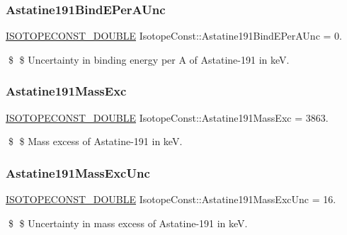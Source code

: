 \subsubsection{\texorpdfstring{Astatine191\+Bind\+E\+Per\+A\+Unc}{Astatine191BindEPerAUnc}}
{\footnotesize\ttfamily \mbox{\hyperlink{group___isotope_const-_macros_ga8f45a7272ce02c0b4c65c44636ed719a}{I\+S\+O\+T\+O\+P\+E\+C\+O\+N\+S\+T\+\_\+\+D\+O\+U\+B\+LE}} Isotope\+Const\+::\+Astatine191\+Bind\+E\+Per\+A\+Unc = 0.}

\$ \$ Uncertainty in binding energy per A of Astatine-\/191 in keV. \mbox{\label{group___isotope_const-_astatine-_at191_ga2fa51c2af35a4201313e422bfb1be93d}} 
\subsubsection{\texorpdfstring{Astatine191\+Mass\+Exc}{Astatine191MassExc}}
{\footnotesize\ttfamily \mbox{\hyperlink{group___isotope_const-_macros_ga8f45a7272ce02c0b4c65c44636ed719a}{I\+S\+O\+T\+O\+P\+E\+C\+O\+N\+S\+T\+\_\+\+D\+O\+U\+B\+LE}} Isotope\+Const\+::\+Astatine191\+Mass\+Exc = 3863.}

\$ \$ Mass excess of Astatine-\/191 in keV. \mbox{\label{group___isotope_const-_astatine-_at191_ga79b42bf741098b1797484dbf3e3b8985}} 
\subsubsection{\texorpdfstring{Astatine191\+Mass\+Exc\+Unc}{Astatine191MassExcUnc}}
{\footnotesize\ttfamily \mbox{\hyperlink{group___isotope_const-_macros_ga8f45a7272ce02c0b4c65c44636ed719a}{I\+S\+O\+T\+O\+P\+E\+C\+O\+N\+S\+T\+\_\+\+D\+O\+U\+B\+LE}} Isotope\+Const\+::\+Astatine191\+Mass\+Exc\+Unc = 16.}

\$ \$ Uncertainty in mass excess of Astatine-\/191 in keV. \mbox{\label{group___isotope_const-_astatine-_at191_ga75de5318f0d982279dc521ab8e0b25a8}} 
